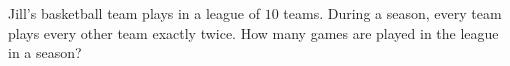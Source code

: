 Jill's basketball team plays in a league of $10$ teams. During a season, every team plays every other team exactly twice. How many games are played in the league in a season?
